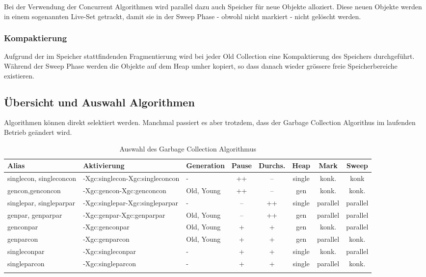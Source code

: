 Bei der Verwendung der Concurrent Algorithmen wird parallel dazu auch Speicher für neue Objekte alloziert. Diese neuen Objekte werden in einem sogenannten Live-Set getrackt, damit sie in der Sweep Phase - obwohl nicht markiert - nicht gelöscht werden.

\subsubsection{Kompaktierung}
Aufgrund der im Speicher stattfindenden Fragmentierung wird bei jeder Old Collection eine Kompaktierung des Speichers durchgeführt. Während der Sweep Phase werden die Objekte auf dem Heap umher kopiert, so dass danach wieder grössere freie Speicherbereiche existieren.

\subsection{Übersicht und Auswahl Algorithmen}\label{auswahl_algorithmen}
Algorithmen können direkt selektiert werden. Manchmal passiert es aber trotzdem, dass der Garbage Collection Algorithus im laufenden Betrieb geändert wird.
  \begin{longtable}{|p{2cm}|p{2.8cm}|l|c|c|c|c|c|}
    \hline
  \textbf{Alias} & \textbf{Aktivierung}& \textbf{Generation} & \textbf{Pause} &\textbf{Durchs.} & \textbf{Heap} & \textbf{Mark} & \textbf{Sweep} \\\hline
  singlecon, singleconcon & -Xgc:singlecon\newline-Xgc:singleconcon& - &++&--& single & konk. & konk\\\hline

  gencon,\newline genconcon& -Xgc:gencon\newline-Xgc:genconcon &Old, Young&++&-- & gen & konk. & konk.\\\hline	
 
  singlepar, \newline singleparpar& -Xgc:singlepar\newline-Xgc:singleparpar & - & -- & ++ & single & parallel & parallel \\\hline
  genpar, \newline genparpar& -Xgc:genpar\newline-Xgc:genparpar & Old, Young & -- & ++ & gen& parallel & parallel \\\hline
  genconpar &-Xgc:genconpar&Old, Young&+&+&gen& konk. & parallel \\\hline
  genparcon &-Xgc:genparcon&Old, Young&+&+&gen& parallel & konk. \\\hline
  singleconpar &-Xgc:singleconpar&-&+&+&single&konk. & parallel \\\hline
  singleparcon& -Xgc:singleparcon&-&+&+&single&parallel & konk. \\\hline
\caption{Auswahl des Garbage Collection Algorithmus}
  \end{longtable}

